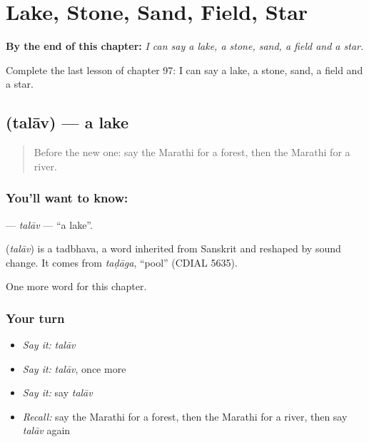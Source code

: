 
\chapter{Lake, Stone, Sand, Field, Star}
\label{ch:mr-lake-stone-sand-field-star}

\begin{chapteropening}
\textbf{By the end of this chapter:} \emph{I can say a lake, a stone, sand, a field and a star.}

Complete the last lesson of chapter 97: I can say a lake, a stone, sand, a field and a star.
\end{chapteropening}

\section[\texorpdfstring{\mr{तलाव} (talāv)}{तलाव (talāv)}]{ (talāv) — a lake}

\label{lesson:MR-C97-talav}



\begin{quote}
Before the new one: say the Marathi for a forest, then the Marathi for a river.
\end{quote}

\subsection*{You'll want to know: }
\textbf{} — \emph{talāv} — \textquotedblleft{}a lake\textquotedblright{}.

\begin{cousinweb}
\textbf{} (\emph{talāv}) is a tadbhava, a word inherited from Sanskrit and reshaped by sound change. It comes from \emph{taḍāga}, \textquotedblleft{}pool\textquotedblright{} (CDIAL 5635).
\end{cousinweb}

\begin{grammarlens}[title={What you've built}]
One more word for this chapter.
\end{grammarlens}

\subsection*{Your turn}
\begin{itemize}
\raggedright
  \item \emph{Say it:} \emph{talāv}
  \item \emph{Say it:} \emph{talāv}, once more
  \item \emph{Say it:} say \emph{talāv}
  \item \emph{Recall:} say the Marathi for a forest, then the Marathi for a river, then say \emph{talāv} again
\end{itemize}

